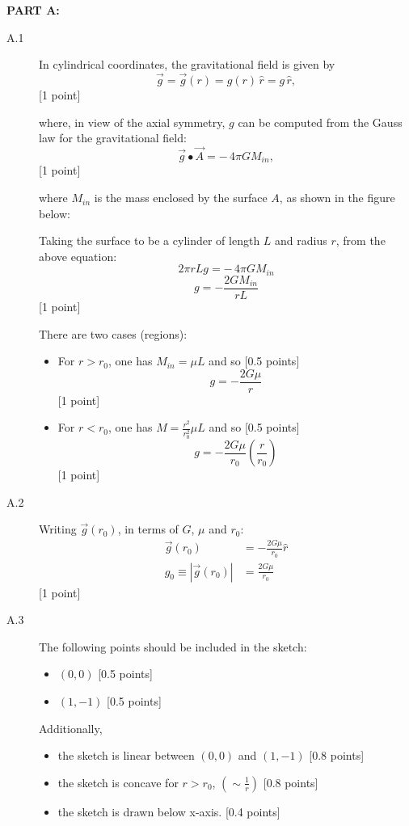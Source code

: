 \textbf{PART A:}

\begin{description}
\item[A.1] In cylindrical coordinates, the gravitational field is given by
  \[ \vec{g} = \vec{g}(r) = g(r)\,\hat{r} = g\,\hat{r}, \]
  \hfill[1 point]

  where, in view of the axial symmetry, $g$ can be computed from the Gauss
  law for the gravitational field:
  \[ \vec{g}\bullet\vec{A} = -\,4\pi G M_{in}, \]
  \hfill[1 point]

  where $M_{in}$ is the mass enclosed by the surface $A$, as shown in the
  figure below:

  Taking the surface to be a cylinder of length $L$ and radius $r$, from
  the above equation:
  \[ 2\pi r L g = -\,4\pi G M_{in} \]
  \[ g = -\frac{2GM_{in}}{rL} \]
  \hfill[1 point]

  There are two cases (regions):
  \begin{itemize}
  \item For $r > r_0$, one has $M_{in} = \mu L$ and so \hfill[0.5 points]
    \[ g = -\frac{2G\mu}{r} \]
    \hfill[1 point]
  \item For $r < r_0$, one has $M = \frac{r^2}{r_0^2}\mu L$ and so
    \hfill[0.5 points]
    \[ g = -\frac{2G\mu}{r_0}\left(\frac{r}{r_0}\right) \]
    \hfill[1 point]
  \end{itemize}

\item[A.2] Writing $\vec{g}(r_0)$, in terms of $G$, $\mu$ and $r_0$:
  \begin{align*}
  \vec{g}(r_0) &= -\frac{2G\mu}{r_0}\hat{r}\\
  g_0 \equiv \left|\vec{g}(r_0)\right| &= \frac{2G\mu}{r_0}
  \end{align*}
  \hfill[1 point]

\item[A.3] The following points should be included in the sketch:
  \begin{itemize}
  \item $(0, 0)$ \hfill[0.5 points]
  \item $(1, -1)$ \hfill[0.5 points]
  \end{itemize}
  Additionally,
  \begin{itemize}
  \item the sketch is linear between $(0,0)$ and $(1,-1)$
    \hfill[0.8 points]
  \item the sketch is concave for $r > r_0$,
    $\left(\sim\frac{1}{r}\right)$ \hfill[0.8 points]
  \item the sketch is drawn below x-axis. \hfill[0.4 points]
  \end{itemize}


\end{description}
